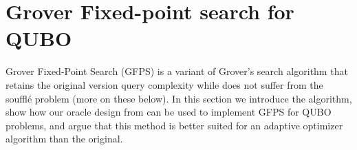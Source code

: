 \documentclass[reqno, 10pt]{amsart}
\numberwithin{equation}{section}                %
\begin{document}
\bigskip

\section{Grover Fixed-point search for QUBO}
\label{sec:grover_for_qubo}

Grover Fixed-Point Search (GFPS) \cite{yoder_fixed_2014} is a variant of Grover's search algorithm that retains the original version query complexity while does not suffer from the souffl\'e problem (more on these below). In this section we introduce the algorithm, show how our oracle design from  can be used to implement GFPS for QUBO problems, and argue that this method is better suited for an adaptive optimizer algorithm than the original.

\smallskip
\end{document}
